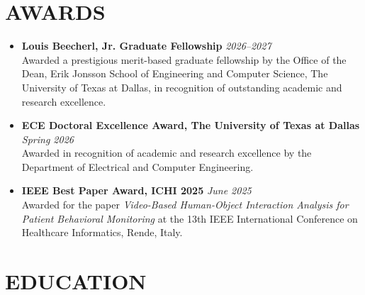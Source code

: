 \documentclass[10pt,a4paper,sans]{moderncv}
\begin{document}
\section{AWARDS}
\begin{itemize}[leftmargin=0.35cm, label={\textbullet}, itemsep=0.3em, parsep=0pt]
    
    \item \textbf{Louis Beecherl, Jr. Graduate Fellowship} \hfill \textit{2026--2027}\\
    Awarded a prestigious merit-based graduate fellowship by the Office of the Dean, Erik Jonsson School of Engineering and Computer Science, The University of Texas at Dallas, in recognition of outstanding academic and research excellence.

    \item \textbf{ECE Doctoral Excellence Award, The University of Texas at Dallas} \hfill \textit{Spring 2026}\\
    Awarded in recognition of academic and research excellence by the Department of Electrical and Computer Engineering.

    \item \textbf{IEEE Best Paper Award, ICHI 2025} \hfill \textit{June 2025}\\
    Awarded for the paper \textit{Video-Based Human-Object Interaction Analysis for Patient Behavioral Monitoring} at the 13th IEEE International Conference on Healthcare Informatics, Rende, Italy.

\end{itemize}

\vspace*{-6mm}

\section{EDUCATION}
\end{document}
